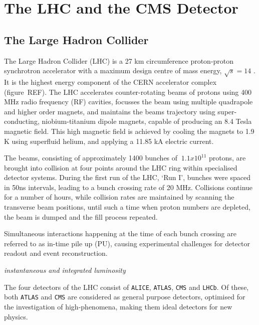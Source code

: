 \chapter{The LHC and the CMS Detector}

\ifpdf
    \graphicspath{{Chapter3/Figs/Raster/}{Chapter3/Figs/PDF/}{Chapter3/Figs/}}
\else
    \graphicspath{{Chapter3/Figs/Vector/}{Chapter3/Figs/}}
\fi


\section{The Large Hadron Collider}  %
\label{sec:detector_lhc}

The Large Hadron Collider (LHC) is a 27 km circumference proton-proton 
synchrotron accelerator with a maximum design centre of mass energy,
$\sqrt{s} = 14$ \tev. It is the highest energy component of the CERN accelerator
complex (figure~REF). The LHC accelerates counter-rotating beams of protons 
using 400 MHz radio frequency
(RF) cavities, focusses the beam using multiple quadrapole and higher order magnets,
and maintains the beams trajectory using super-conducting, niobium-titanium 
dipole magnets, capable of producing an 8.4 Tesla magnetic field. This high 
magnetic field is achieved by cooling the magnets to 1.9 K using superfluid 
helium, and applying a 11.85 kA electric current.

The beams, consisting of approximately 1400 bunches of $~1.1x10^{11}$ protons,
are brought into collision
at four points around the LHC ring within specialised detector systems. During the
first run of the LHC, `Run I', bunches were spaced in 50ns intervals, leading to
a bunch crossing rate of 20 MHz. Collisions continue for a number of hours, 
while collision rates are maintained by scanning the transverse beam positions, 
until such a time when proton numbers are depleted, the beam is dumped and the 
fill process repeated.

Simultaneous interactions happening at the time
of each bunch crossing are referred to as in-time pile up (PU), 
causing experimental challenges for detector readout and event reconstruction.

\emph{instantaneous and integrated luminosity}

The four detectors of the LHC consist of \texttt{ALICE}, \texttt{ATLAS},
\texttt{CMS} and \texttt{LHCb}. Of these, both \texttt{ATLAS} and \texttt{CMS} 
are considered as general purpose detectors, optimised for the investigation of
high-\Pt phenomena, making them ideal detectors for new physics.


